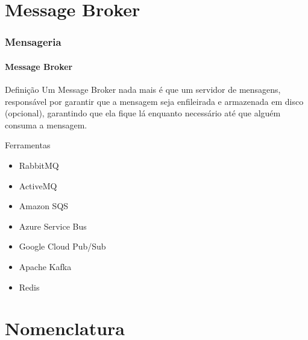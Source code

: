 \documentclass[
	9pt, %
	t, %
]{beamer}
\newcommand{\yellowbox}[1]{\colorbox{yellow!75}{#1}}
\begin{document}
\section{Message Broker}

\begin{frame}
	\frametitle{Mensageria}
	\framesubtitle{Message Broker}

	\begin{block}{Definição}
		Um Message Broker nada mais é que um \yellowbox{servidor de mensagens}, responsável por garantir que a mensagem seja enfileirada e armazenada em disco (opcional), garantindo que ela fique lá enquanto necessário até que alguém consuma a mensagem.
	\end{block}

	\begin{block}{Ferramentas}
		\begin{itemize}
			\item RabbitMQ
			\item ActiveMQ
			\item Amazon SQS
			\item Azure Service Bus
			\item Google Cloud Pub/Sub
			\item Apache Kafka
			\item Redis
		\end{itemize}
	\end{block}

\end{frame}

\section{Nomenclatura}
\end{document}
